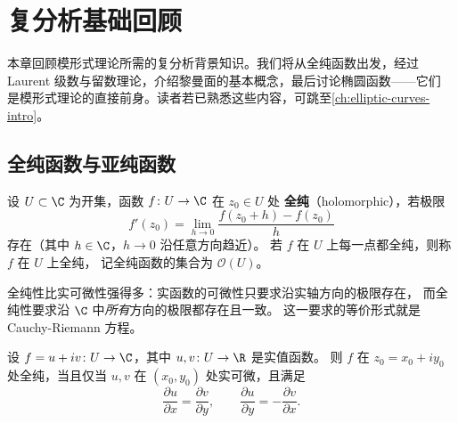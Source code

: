 \chapter{复分析基础回顾}
\label{ch:complex-analysis}

本章回顾模形式理论所需的复分析背景知识。我们将从全纯函数出发，经过
Laurent 级数与留数理论，介绍黎曼面的基本概念，最后讨论椭圆函数——它们
是模形式理论的直接前身。读者若已熟悉这些内容，可跳至\cref{ch:elliptic-curves-intro}。

\section{全纯函数与亚纯函数}
\label{sec:holomorphic}

\begin{definition}[全纯函数]
\label{def:holomorphic}
设 $U \subset \C$ 为开集，函数 $f\colon U \to \C$ 在 $z_0 \in U$ 处
\textbf{全纯}（holomorphic），若极限
\[
  f'(z_0) = \lim_{h \to 0} \frac{f(z_0 + h) - f(z_0)}{h}
\]
存在（其中 $h \in \C$，$h \to 0$ 沿任意方向趋近）。
若 $f$ 在 $U$ 上每一点都全纯，则称 $f$ 在 $U$ 上全纯，
记全纯函数的集合为 $\mathcal{O}(U)$。
\end{definition}

\begin{remark}
全纯性比实可微性强得多：实函数的可微性只要求沿实轴方向的极限存在，
而全纯性要求沿 $\C$ 中\emph{所有}方向的极限都存在且一致。
这一要求的等价形式就是 Cauchy-Riemann 方程。
\end{remark}

\begin{theorem}
\label{thm:cauchy-riemann}
设 $f = u + iv\colon U \to \C$，其中 $u, v\colon U \to \R$ 是实值函数。
则 $f$ 在 $z_0 = x_0 + iy_0$ 处全纯，当且仅当 $u, v$ 在 $(x_0, y_0)$
处实可微，且满足
\[
  \frac{\partial u}{\partial x} = \frac{\partial v}{\partial y},
  \qquad
  \frac{\partial u}{\partial y} = -\frac{\partial v}{\partial x}.
\]
\end{theorem}

